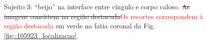  \begin{figure}[H]
\centering
    \hfill
    \caption{Sujeito 3: ``beijo'' na interface entre cíngulo e corpo caloso. \sout{As imagens consistem na região destacada}\textcolor{red}{Os recortes correspondem à região destacada} em verde na fatia coronal da Fig. \ref{fig::105923_localizacao}.
    }
    \label{fig::105923_kissing}
\end{figure}

